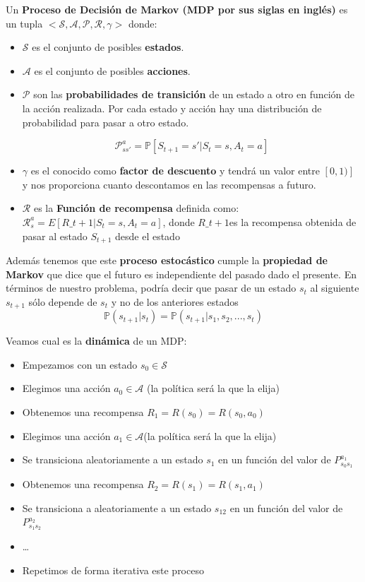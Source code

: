 \documentclass[
  a4paper,
  DIV=11,
  numbers=noendperiod]{scrreprt}
\providecommand{\tightlist}{%
  \setlength{\itemsep}{0pt}\setlength{\parskip}{0pt}}\usepackage{longtable,booktabs,array}
\begin{document}
Un \textbf{Proceso de Decisión de Markov (MDP por sus siglas en inglés)}
es un tupla \(<\mathcal S,\mathcal A,\mathcal P,\mathcal R, \gamma >\)
donde:

\begin{itemize}
\item
  \(\mathcal S\) es el conjunto de posibles \textbf{estados}.
\item
  \(\mathcal A\) es el conjunto de posibles \textbf{acciones}.
\item
  \(\mathcal P\) son las \textbf{probabilidades de transición} de un
  estado a otro en función de la acción realizada. Por cada estado y
  acción hay una distribución de probabilidad para pasar a otro estado.

  \[
  \mathcal P_{ss'}^a=\mathbb P[S_{t+1}=s'|S_t=s,A_t=a]\]
\item
  \(\gamma\) es el conocido como \textbf{factor de descuento} y tendrá
  un valor entre \([0,1)]\) y nos proporciona cuanto descontamos en las
  recompensas a futuro.
\item
  \(\mathcal R\) es la \textbf{Función de recompensa} definida como:
  \(\mathcal R_s^a=E[R\_{t+1}|S_t=s, A_t=a]\), donde \(R\_{t+1}\)es la
  recompensa obtenida de pasar al estado \(S_{t+1}\) desde el estado
\end{itemize}

Además tenemos que este \textbf{proceso estocástico} cumple la
\textbf{propiedad de Markov} que dice que el futuro es independiente del
pasado dado el presente. En términos de nuestro problema, podría decir
que pasar de un estado \(s_t\) al siguiente \(s_{t+1}\) sólo depende de
\(s_t\) y no de los anteriores estados \[
\mathbb P(s_{t+1}|s_t)= \mathbb P(s_{t+1}|s_1,s_2,...,s_t)
\]

Veamos cual es la \textbf{dinámica} de un MDP:

\begin{itemize}
\tightlist
\item
  Empezamos con un estado \(s_0 \in \mathcal S\)
\item
  Elegimos una acción \(a_0 \in \mathcal A\) (la política será la que la
  elija)
\item
  Obtenemos una recompensa \(R_1 = R(s_0) = R(s_0, a_0)\)
\item
  Elegimos una acción \(a_1 \in \mathcal A\)(la política será la que la
  elija)
\item
  Se transiciona aleatoriamente a un estado \(s_1\) en un función del
  valor de \(P_{s_0s_1}^{a_1}\)
\item
  Obtenemos una recompensa \(R_2 = R(s_1) = R(s_1, a_1)\)
\item
  Se transiciona a aleatoriamente a un estado \(s_12\) en un función del
  valor de \(P_{s_1s_2}^{a_2}\)
\item
  \ldots{}
\item
  Repetimos de forma iterativa este proceso
\end{itemize}
\end{document}
